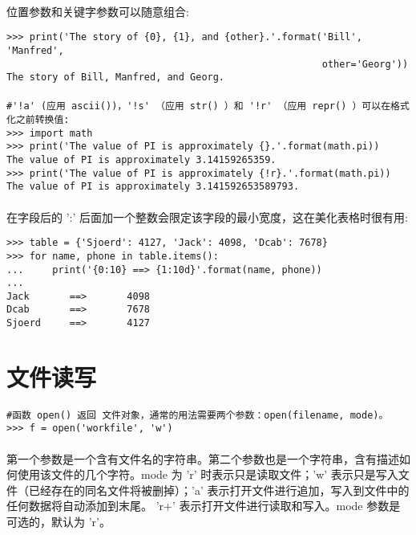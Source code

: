 \documentclass{article}
\begin{document}
\begin{CJK}{UTF8}{gbsn}
\paragraph{}
位置参数和关键字参数可以随意组合:
\begin{verbatim}
>>> print('The story of {0}, {1}, and {other}.'.format('Bill', 'Manfred',
                                                       other='Georg'))
The story of Bill, Manfred, and Georg.
\end{verbatim}
\paragraph{}
\begin{verbatim}
#'!a' (应用 ascii())，'!s' （应用 str() ）和 '!r' （应用 repr() ）可以在格式化之前转换值:
>>> import math
>>> print('The value of PI is approximately {}.'.format(math.pi))
The value of PI is approximately 3.14159265359.
>>> print('The value of PI is approximately {!r}.'.format(math.pi))
The value of PI is approximately 3.141592653589793.
\end{verbatim}
\paragraph{}
在字段后的 ':' 后面加一个整数会限定该字段的最小宽度，这在美化表格时很有用:
\begin{verbatim}
>>> table = {'Sjoerd': 4127, 'Jack': 4098, 'Dcab': 7678}
>>> for name, phone in table.items():
...     print('{0:10} ==> {1:10d}'.format(name, phone))
...
Jack       ==>       4098
Dcab       ==>       7678
Sjoerd     ==>       4127
\end{verbatim}
\section{文件读写}
\paragraph{}
\begin{verbatim}
#函数 open() 返回 文件对象，通常的用法需要两个参数：open(filename, mode)。
>>> f = open('workfile', 'w')
\end{verbatim}
\paragraph{}
第一个参数是一个含有文件名的字符串。第二个参数也是一个字符串，含有描述如何使用该文件的几个字符。mode 为 'r' 时表示只是读取文件；'w' 表示只是写入文件（已经存在的同名文件将被删掉）；'a' 表示打开文件进行追加，写入到文件中的任何数据将自动添加到末尾。 'r+' 表示打开文件进行读取和写入。mode 参数是可选的，默认为 'r'。
\paragraph{}

\end{CJK}
\end{document}

